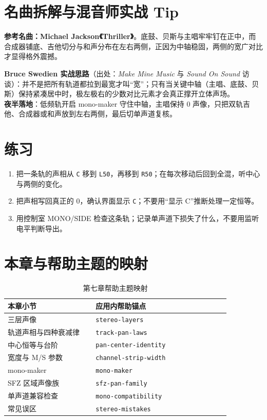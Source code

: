 \section{名曲拆解与混音师实战 Tip}

\textbf{参考名曲：Michael Jackson《Thriller》}。底鼓、贝斯与主唱牢牢钉在正中，而合成器铺底、吉他切分与和声分布在左右两侧，正因为中轴稳固，两侧的宽广对比才显得格外震撼。

\begin{tipbox}
\textbf{Bruce Swedien 实战思路}（出处：\emph{Make Mine Music} 与 \emph{Sound On Sound} 访谈）：并不是把所有轨道都拉到最宽才叫“宽”；只有当关键中轴（主唱、底鼓、贝斯）保持紧凑居中时，极左极右的少数对比元素才会真正撑开立体声场。\\
\textbf{夜半落地}：低频轨开启 mono-maker 守住中轴，主唱保持 0 声像，只把双轨吉他、合成器或和声放到左右两侧，最后切单声道复核。
\end{tipbox}

\section{练习}


\begin{exercise}
\begin{enumerate}
  \item 把一条轨的声相从 \texttt{C} 移到 \texttt{L50}，再移到 \texttt{R50}；在每次移动后回到全混，听中心与两侧的变化。
  \item 把声相写回真正的 $0$，确认界面显示 \texttt{C}；不要用“显示 C”推断处理一定恒等。
  \item 用控制室 MONO/SIDE 检查这条轨；记录单声道下损失了什么，不要用监听电平判断导出。
\end{enumerate}
\end{exercise}

\section{本章与帮助主题的映射}

\begin{table}[htbp]
\centering
\small
\begin{tabular}{@{}p{0.34\linewidth}p{0.52\linewidth}@{}}
\hline
本章小节 & 应用内帮助锚点 \\
\hline
三层声像 & \texttt{stereo-layers} \\
轨道声相与四种衰减律 & \texttt{track-pan-laws} \\
中心恒等与台阶 & \texttt{pan-center-identity} \\
宽度与 M/S 参数 & \texttt{channel-strip-width} \\
mono-maker & \texttt{mono-maker} \\
SFZ 区域声像族 & \texttt{sfz-pan-family} \\
单声道兼容检查 & \texttt{mono-compatibility} \\
常见误区 & \texttt{stereo-mistakes} \\
\hline
\end{tabular}
\caption{第七章帮助主题映射}
\label{tab:stereo-help-map}
\end{table}

